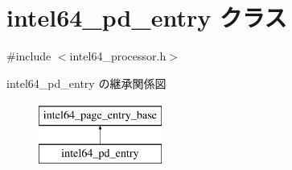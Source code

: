 \hypertarget{classintel64__pd__entry}{}\section{intel64\+\_\+pd\+\_\+entry クラス}
\label{classintel64__pd__entry}


{\ttfamily \#include $<$intel64\+\_\+processor.\+h$>$}

intel64\+\_\+pd\+\_\+entry の継承関係図\begin{figure}[H]
\begin{center}
\leavevmode
\includegraphics[height=2.000000cm]{classintel64__pd__entry}
\end{center}
\end{figure}
